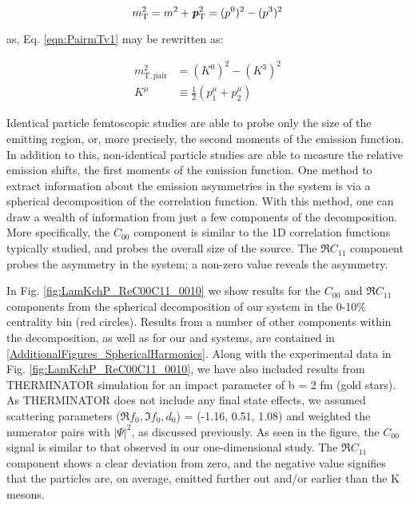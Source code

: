 \documentclass[/home/jesse/Analysis/FemtoAnalysis/AnalysisNotes/AnalysisNoteJBuxton.tex]{subfiles}
\begin{document}
\begin{equation}
 m_{\mathrm{T}}^{2} = m^{2} + \textbf{\textit{p}}_{\mathrm{T}}^{2} = (p^{0})^{2} - (p^{3})^{2}
\label{eqn:SinglemT}
\end{equation}

as, Eq. \ref{eqn:PairmTv1} may be rewritten as:



\begin{equation}
\begin{aligned}
m_{\mathrm{T, pair}}^{2} &= (K^{0})^{2} - (K^{3})^{2} \\
K^{\mu} & \equiv \frac{1}{2} \left( p_{1}^{\mu} + p_{2}^{\mu} \right)
\end{aligned}
\label{eqn:PairmTv2}
\end{equation}



Identical particle femtoscopic studies are able to probe only the size of the emitting region, or, more precisely, the second moments of the emission function.
In addition to this, non-identical particle studies are able to measure the relative emission shifts, the first moments of the emission function.
One method to extract information about the emission asymmetries in the system is via a spherical decomposition of the correlation function.
With this method, one can draw a wealth of information from just a few components of the decomposition.
More specifically, the $C_{00}$ component is similar to the 1D correlation functions typically studied, and probes the overall size of the source.
The $\Re C_{11}$ component probes the asymmetry in the system; a non-zero value reveals the asymmetry. 

In Fig. \ref{fig:LamKchP_ReC00C11_0010} we show results for the $C_{00}$ and $\Re C_{11}$ components from the spherical decomposition of our \LamKchP system in the 0-10\% centrality bin (red circles).
Results from a number of other components within the decomposition, as well as for our \LamKs and \LamKchM systems, are contained in \ref{AdditionalFigures_SphericalHarmonics}.
Along with the experimental data in Fig. \ref{fig:LamKchP_ReC00C11_0010}, we have also included results from THERMINATOR simulation for an impact parameter of b = 2 fm (gold stars).
As THERMINATOR does not include any final state effects, we assumed scattering parameters ($\Re f_{0}, \Im f_{0}, d_{0}$) = (-1.16, 0.51, 1.08) and weighted the numerator pairs with $|\Psi|^{2}$, as discussed previously.
As seen in the figure, the $C_{00}$ signal is similar to that observed in our one-dimensional study.
The $\Re C_{11}$ component shows a clear deviation from zero, and the negative value signifies that the \Lam particles are, on average, emitted further out and/or earlier than the K mesons.
\end{document}
